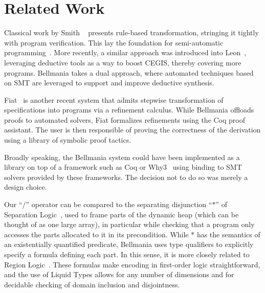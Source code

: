 \section{Related Work}
\label{related}

Classical work by Smith \etal~\cite{AI85/Smith} presents rule-based transformation, stringing it
tightly with program verification. This lay the foundation for semi-automatic programming~\cite{CPS91/Blaine,TSE90/Smith,TPHOLs96/Butler}.
More recently, a similar approach was introduced into Leon~\cite{OOPSLA13/Kneuss}, leveraging deductive
tools as a way to boost CEGIS, thereby covering more programs. Bellmania takes a dual approach, where
automated techniques based on SMT are leveraged to support and improve deductive synthesis.

Fiat~\cite{POPL15/Delaware} is another recent system that admits stepwise transformation of specifications
into programs via a refinement calculus. While Bellmania offloads proofs to automated solvers,
Fiat formalizes refinements using the Coq proof assistant. The user is then responsible of proving
the correctness of the derivation using a library of symbolic proof tactics.

Broadly speaking, the Bellmania system could have been implemented as a library on top of a framework
such as Coq or Why3~\cite{ESOP13/Filliatre} using binding to SMT solvers provided by these frameworks.
The decision not to do so was merely a design choice.

Our ``$\big/$'' operator can be compared to the separating disjunction ``$\ast$'' of Separation Logic~\cite{LICS02/Reynolds},
used to frame parts of the dynamic heap (which can be thought of as one large array),
in particular while checking that a program only accesses the parts allocated to it in its precondition.
While $\ast$ has the semantics of an existentially quantified predicate, Bellmania uses type qualifiers
to explicitly specify a formula defining each part. In this sense, it is more closely related to
Region Logic~\cite{ECOOP08/Banerjee}. These formulas make encoding in first-order logic straightforward,
and the use of Liquid Types allows for any number of dimensions and for decidable checking of domain inclusion
and disjointness.
